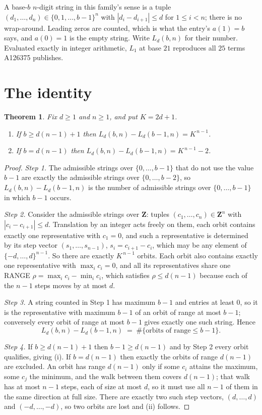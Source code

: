\documentclass[11pt,a4paper]{article}
\theoremstyle{plain}
\newtheorem{theorem}{Theorem}
\theoremstyle{definition}
\begin{document}
A base-$b$ $n$-digit string in this family's sense is a tuple
$(d_1,\dots,d_n)\in\{0,1,\dots,b-1\}^{n}$ with $|d_i-d_{i+1}|\le d$ for $1\le i<n$; there
is no wrap-around. Leading zeros are counted, which is what the entry's $a(1)=b$ says, and
$a(0)=1$ is the empty string. Write $L_d(b,n)$ for their number. Evaluated exactly in integer
arithmetic, $L_{1}$ at base $21$ reproduces all $25$ terms A126375 publishes.

\section{The identity}

\begin{theorem}
Fix $d\ge1$ and $n\ge1$, and put $K=2d+1$.
\begin{enumerate}
\item[(i)] If $b\ge d(n-1)+1$ then $L_d(b,n)-L_d(b-1,n)=K^{\,n-1}$.
\item[(ii)] If $b=d(n-1)$ then $L_d(b,n)-L_d(b-1,n)=K^{\,n-1}-2$.
\end{enumerate}
\end{theorem}

\begin{proof}
\emph{Step 1.} The admissible strings over $\{0,\dots,b-1\}$ that do not use the value $b-1$
are exactly the admissible strings over $\{0,\dots,b-2\}$, so $L_d(b,n)-L_d(b-1,n)$ is the
number of admissible strings over $\{0,\dots,b-1\}$ in which $b-1$ occurs.

\emph{Step 2.} Consider the admissible strings over $\mathbf{Z}$: tuples
$(c_1,\dots,c_n)\in\mathbf{Z}^{n}$ with $|c_i-c_{i+1}|\le d$. Translation by an integer acts
freely on them, each orbit contains exactly one representative with $c_1=0$, and such a
representative is determined by its step vector $(s_1,\dots,s_{n-1})$, $s_i=c_{i+1}-c_i$,
which may be any element of $\{-d,\dots,d\}^{n-1}$. So there are exactly $K^{\,n-1}$ orbits.
Each orbit also contains exactly one representative with $\max_i c_i=0$, and all its
representatives share one RANGE $\rho=\max_ic_i-\min_ic_i$, which satisfies
$\rho\le d(n-1)$ because each of the $n-1$ steps moves by at most $d$.

\emph{Step 3.} A string counted in Step 1 has maximum $b-1$ and entries at least $0$, so it is
the representative with maximum $b-1$ of an orbit of range at most $b-1$; conversely every orbit
of range at most $b-1$ gives exactly one such string. Hence
\[
L_d(b,n)-L_d(b-1,n)\;=\;\#\{\text{orbits of range}\le b-1\} .
\]

\emph{Step 4.} If $b\ge d(n-1)+1$ then $b-1\ge d(n-1)$ and by Step 2 every orbit qualifies,
giving (i). If $b=d(n-1)$ then exactly the orbits of range $d(n-1)$ are excluded. An orbit has
range $d(n-1)$ only if some $c_i$ attains the maximum, some $c_j$ the minimum, and the walk
between them covers $d(n-1)$; that walk has at most $n-1$ steps, each of size at most $d$, so it
must use all $n-1$ of them in the same direction at full size. There are exactly two such step
vectors, $(d,\dots,d)$ and $(-d,\dots,-d)$, so two orbits are lost and (ii) follows.
\end{proof}
\end{document}
